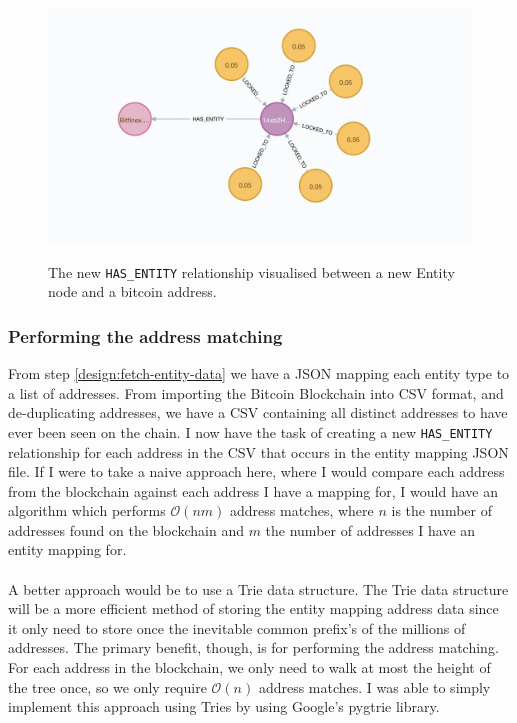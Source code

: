 \begin{figure}[h!]
  \centering
  \includegraphics[width = 15cm]{./figures/has-entity-relationship}\\[0.5cm] 
  \caption{The new \texttt{HAS\_ENTITY} relationship visualised between a new Entity node and a bitcoin address.}
  \label{fig:neo4j-has-entity}
\end{figure}

\subsubsection{Performing the address matching} 
From step \ref{design:fetch-entity-data} we have a JSON mapping each entity type to a list of addresses. From importing the Bitcoin Blockchain into CSV format, and de-duplicating addresses, we have a CSV containing all distinct addresses to have ever been seen on the chain. I now have the task of creating a new \texttt{HAS\_ENTITY} relationship for each address in the CSV that occurs in the entity mapping JSON file. If I were to take a naive approach here, where I would compare each address from the blockchain against each address I have a mapping for, I would have an algorithm which performs $\mathcal{O}(nm)$ address matches, where $n$ is the number of addresses found on the blockchain and $m$ the number of addresses I have an entity mapping for. 
\\\\
A better approach would be to use a Trie data structure. The Trie data structure will be a more efficient method of storing the entity mapping address data since it only need to store once the inevitable common prefix's of the millions of addresses. The primary benefit, though, is for performing the address matching. For each address in the blockchain, we only need to walk at most the height of the tree once, so we only require $\mathcal{O}(n)$ address matches. I was able to simply implement this approach using Tries by using Google's pygtrie library. 

